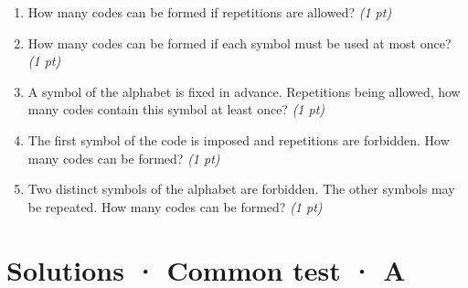 \begin{enumerate}

\item How many codes can be formed if repetitions are allowed? \hfill\textit{(1 pt)}

\item How many codes can be formed if each symbol must be used at most once? \hfill\textit{(1 pt)}

\item A symbol of the alphabet is fixed in advance. Repetitions being allowed, how many codes contain this symbol at least once? \hfill\textit{(1 pt)}

\item The first symbol of the code is imposed and repetitions are forbidden. How many codes can be formed? \hfill\textit{(1 pt)}

\item Two distinct symbols of the alphabet are forbidden. The other symbols may be repeated. How many codes can be formed? \hfill\textit{(1 pt)}

\end{enumerate}

\ifmxteacher\mxnewpage

\section*{Solutions · Common test · A}\label{cor:3-3}

